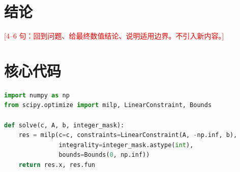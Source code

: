 \documentclass[UTF8, zihao=-4, fontset=windows, a4paper]{ctexart}
\newcommand{\todo}[1]{\textcolor{red}{[#1]}}   %
\begin{document}
\section{结论}
\todo{4--6 句：回到问题、给最终数值结论、说明适用边界。不引入新内容。}

\printbibliography[heading=bibintoc,title={参考文献}]

\newpage
\appendix
\section{核心代码}
\lstset{basicstyle=\ttfamily\footnotesize,breaklines=true,frame=single,
        numbers=left,numberstyle=\tiny}
\begin{lstlisting}[language=Python,caption={求解核心代码（节选）}]
import numpy as np
from scipy.optimize import milp, LinearConstraint, Bounds

def solve(c, A, b, integer_mask):
    res = milp(c=c, constraints=LinearConstraint(A, -np.inf, b),
               integrality=integer_mask.astype(int),
               bounds=Bounds(0, np.inf))
    return res.x, res.fun
\end{lstlisting}
\end{document}
